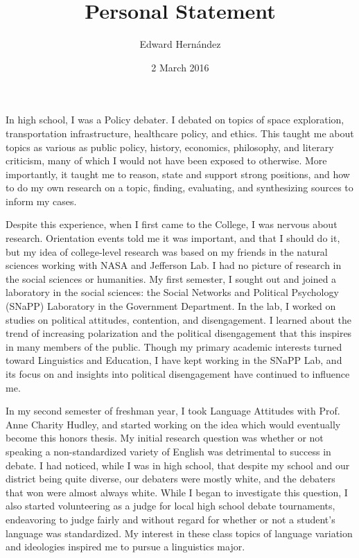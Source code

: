 \documentclass[doc,12pt,natbib]{apa6}
\begin{document}
\title{Personal Statement}
\author{Edward Hern\'{a}ndez}
\date{2 March 2016}
\maketitle

In high school, I was a Policy debater. I debated on topics of space
exploration, transportation infrastructure, healthcare policy, and ethics. This
taught me about topics as various as public policy, history, economics,
philosophy, and literary criticism, many of which I would not have been exposed
to otherwise. More importantly, it taught me to reason, state and support
strong positions, and how to do my own research on a topic, finding,
evaluating, and synthesizing sources to inform my cases.

Despite this experience, when I first came to the College, I was nervous about
research. Orientation events told me it was important, and that I should do it,
but my idea of college-level research was based on my friends in the natural
sciences working with NASA and Jefferson Lab. I had no picture of research in
the social sciences or humanities. My first semester, I sought out and joined a
laboratory in the social sciences: the Social Networks and Political Psychology
(SNaPP) Laboratory in the Government Department. In the lab, I worked on
studies on political attitudes, contention, and disengagement. I learned about
the trend of increasing polarization and the political disengagement that this
inspires in many members of the public. Though my primary academic interests
turned toward Linguistics and Education, I have kept working in the SNaPP Lab,
and its focus on and insights into political disengagement have continued to
influence me. 

In my second semester of freshman year, I took Language Attitudes with Prof.
Anne Charity Hudley, and started working on the idea which would eventually
become this honors thesis. My initial research question was whether or not
speaking a non-standardized variety of English was detrimental to success in
debate. I had noticed, while I was in high school, that despite my school and
our district being quite diverse, our debaters were mostly white, and the
debaters that won were almost always white. While I began to investigate this
question, I also started volunteering as a judge for local high school debate
tournaments, endeavoring to judge fairly and without regard for whether or not
a student's language was standardized. My interest in these class topics of
language variation and ideologies inspired me to pursue a linguistics major.
\end{document}
